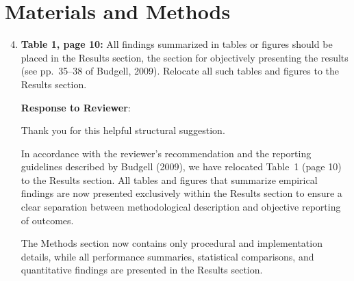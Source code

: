 \documentclass[12pt,letterpaper]{article}
\begin{document}
\section*{Materials and Methods}

\begin{enumerate}
    \setcounter{enumi}{3}
    
    \item \textbf{Table 1, page 10:} All findings summarized in tables or figures should be placed in the Results section, the section for objectively presenting the results (see pp.~35--38 of Budgell, 2009). Relocate all such tables and figures to the Results section.


    

\textbf{Response to Reviewer}:


Thank you for this helpful structural suggestion.

In accordance with the reviewer’s recommendation and the reporting guidelines described by Budgell (2009), we have relocated Table~1 (page 10) to the Results section. All tables and figures that summarize empirical findings are now presented exclusively within the Results section to ensure a clear separation between methodological description and objective reporting of outcomes.

The Methods section now contains only procedural and implementation details, while all performance summaries, statistical comparisons, and quantitative findings are presented in the Results section.












    
    
    


\end{enumerate}
\end{document}
